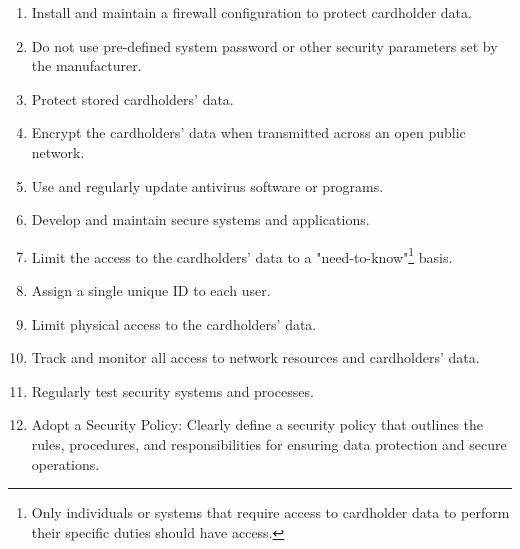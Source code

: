     {}
\begin{enumerate}
    \item Install and maintain a firewall configuration to protect cardholder data.
    \item Do not use pre-defined system password or other security parameters set by the manufacturer.
    {}
    \item Protect stored cardholders' data.
    \item Encrypt the cardholders' data when transmitted across an open public network.
    {}
    \item Use and regularly update antivirus software or programs.
    \item Develop and maintain secure systems and applications.
    {}
    \item Limit the access to the cardholders' data to a "need-to-know"\footnote{Only individuals or systems that require access to cardholder data to perform their specific duties should have access. } basis.
    \item Assign a single unique ID to each user.
    \item Limit physical access to the cardholders' data.
    {}
    \item Track and monitor all access to network resources and cardholders' data.
    \item Regularly test security systems and processes.
    {}
    \item Adopt a Security Policy: Clearly define a security policy that outlines the rules, procedures, and responsibilities for ensuring data protection and secure operations. 
\end{enumerate}

